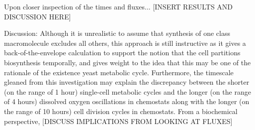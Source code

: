 Upon closer inspection of the times and fluxes... [INSERT RESULTS AND DISCUSSION HERE]

Discussion: Although it is unrealistic to assume that synthesis of one class macromolecule excludes all others, this approach is still instructive as it gives a back-of-the-envelope calculation to support the notion that the cell partitions biosynthesis temporally, and gives weight to the idea that this may be one of the rationale of the existence yeast metabolic cycle.
Furthermore, the timescale gleaned from this investigation may explain the discrepancy between the shorter (on the range of 1 hour) single-cell metabolic cycles and the longer (on the range of 4 hours) dissolved oxygen oscillations in chemostats along with the longer (on the range of 10 hours) cell division cycles in chemostats.
From a biochemical perspective, [DISCUSS IMPLICATIONS FROM LOOKING AT FLUXES]




